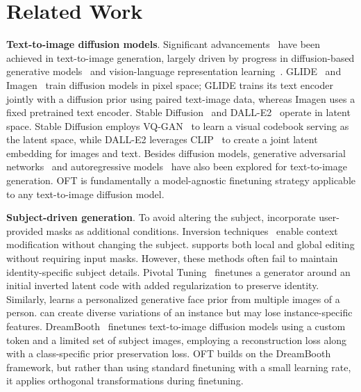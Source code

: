 \section{Related Work}

\textbf{Text-to-image diffusion models}. Significant advancements~\cite{saharia2022photorealistic,ramesh2022hierarchical,rombach2022high,gu2022vector,nichol2022glide} have been achieved in text-to-image generation, largely driven by progress in diffusion-based generative models~\cite{ho2020denoising,song2021score,song2021denoising,dhariwal2021diffusion} and vision-language representation learning~\cite{su2020vlbert,lu2019vilbert,radford2021learning,wang2021simvlm,li2022blip,li2023blip,alayrac2022flamingo,schuhmann2022laion}. GLIDE~\cite{nichol2022glide} and Imagen~\cite{saharia2022photorealistic} train diffusion models in pixel space; GLIDE trains its text encoder jointly with a diffusion prior using paired text-image data, whereas Imagen uses a fixed pretrained text encoder. Stable Diffusion~\cite{rombach2022high} and DALL-E2~\cite{ramesh2022hierarchical} operate in latent space. Stable Diffusion employs VQ-GAN~\cite{esser2021taming} to learn a visual codebook serving as the latent space, while DALL-E2 leverages CLIP~\cite{radford2021learning} to create a joint latent embedding for images and text. Besides diffusion models, generative adversarial networks~\cite{reed2016generative,zhang2017stackgan,xu2018attngan,li2019controllable} and autoregressive models~\cite{ramesh2021zero,ding2021cogview,wu2022nuwa,yuscaling} have also been explored for text-to-image generation. OFT is fundamentally a model-agnostic finetuning strategy applicable to any text-to-image diffusion model.

\textbf{Subject-driven generation}. To avoid altering the subject, \cite{avrahami2022blended,nichol2022glide} incorporate user-provided masks as additional conditions. Inversion techniques~\cite{choi2021ilvr,dhariwal2021diffusion,ramesh2022hierarchical,gal2022image} enable context modification without changing the subject. \cite{hertz2022prompt} supports both local and global editing without requiring input masks. However, these methods often fail to maintain identity-specific subject details. Pivotal Tuning~\cite{roich2022pivotal} finetunes a generator around an initial inverted latent code with added regularization to preserve identity. Similarly, \cite{nitzan2022mystyle} learns a personalized generative face prior from multiple images of a person. \cite{casanova2021instance} can create diverse variations of an instance but may lose instance-specific features. DreamBooth~\cite{ruiz2023dreambooth} finetunes text-to-image diffusion models using a custom token and a limited set of subject images, employing a reconstruction loss along with a class-specific prior preservation loss. OFT builds on the DreamBooth framework, but rather than using standard finetuning with a small learning rate, it applies orthogonal transformations during finetuning.

